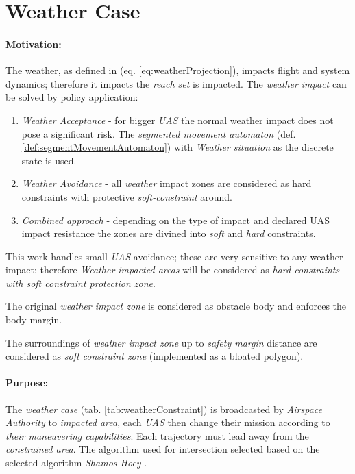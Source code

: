 \section{Weather Case}\label{sec:weatherCase}
\paragraph{Motivation:}  The weather, as defined in (eq. \ref{eq:weatherProjection}), impacts flight and system dynamics; therefore it impacts the \emph{reach set} is impacted. The \emph{weather impact} can be solved by policy application:

\begin{enumerate}
    \item \emph{Weather Acceptance} - for bigger \emph{UAS} the normal weather impact does not pose a significant risk.  The \emph{segmented movement automaton} (def. \ref{def:segmentMovementAutomaton}) with \emph{Weather situation} as the discrete state is used.
    
    \item \emph{Weather Avoidance} - all \emph{weather} impact zones are considered as hard constraints with protective \emph{soft-constraint} around.
    
    \item \emph{Combined approach} - depending on the type of impact and declared UAS impact resistance the zones are divined into \emph{soft} and \emph{hard} constraints.
\end{enumerate}

\begin{note}
    This work handles small \emph{UAS} avoidance; these are very sensitive to any weather impact; therefore \emph{Weather impacted areas} will be considered as \emph{hard constraints with soft constraint protection zone}. 
    
    The original \emph{weather impact zone} is considered as obstacle body and enforces the body margin.
    
    The surroundings of \emph{weather impact zone} up to \emph{safety margin} distance are considered as \emph{soft constraint zone} (implemented as a bloated polygon).
\end{note}

\paragraph{Purpose:} The \emph{weather case} (tab. \ref{tab:weatherConstraint}) is broadcasted by \emph{Airspace Authority} to \emph{impacted area}, each \emph{UAS} then change their mission according to \emph{their maneuvering capabilities}.  Each trajectory must lead away from the \emph{constrained area}. The algorithm used for intersection selected based on \citep{bentley1979algorithms} the selected algorithm  \emph{Shamos-Hoey} \cite{shamos1976geometric}.

